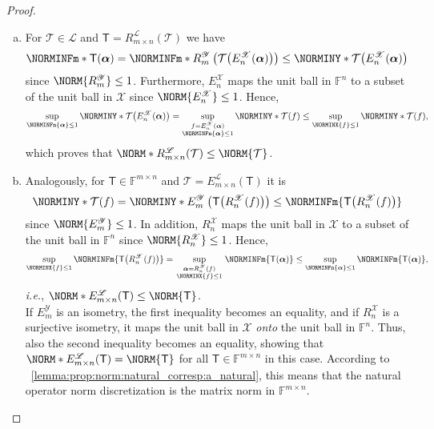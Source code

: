 \documentclass[a4paper]{paper}
\newcommand*{\SPC}[1]{{\ensuremath{\mathscr{#1}}}}
\newcommand*{\SPCL}{\SPC{L}}
\newcommand*{\SPCX}{\SPC{X}}
\newcommand*{\FIELD}{{\ensuremath{\mathbb{F}}}}
\newcommand*{\Fn}{{\ensuremath{\FIELD^n}}}
\newcommand*{\Fmxn}{{\ensuremath{\FIELD^{m \times n}}}}
\newcommand*{\OP}[1]{{\ensuremath{\mathcal{#1}}}}
\newcommand*{\OPT}{\OP{T}}
\newcommand{\DISCOP}[1]{{\ensuremath{\mathsf{#1}}}}
\newcommand*{\DISCOPT}{\DISCOP{T}}
\newcommand*{\EXT}[2]{\ensuremath{E_{#1}^{#2}}}
\newcommand*{\REST}[2]{\ensuremath{R_{#1}^{#2}}}
\newcommand*{\RnX}{{\ensuremath{\REST{n}{\SPC{X}}}}}
\newcommand*{\RmY}{{\ensuremath{\REST{m}{\SPC{Y}}}}}
\newcommand*{\EnX}{{\ensuremath{\EXT{n}{\SPC{X}}}}}
\newcommand*{\EmY}{{\ensuremath{\EXT{m}{\SPC{Y}}}}}
\newcommand*{\STACKSS}[2]{{\ensuremath{\genfrac{}{}{0pt}{1}{#1}{#2}}}}
\newcommand*{\ie}{\textsl{i.e.}\xspace}
\newcommand*{\BDalpha}{\boldsymbol{\alpha}}
\begin{document}
\begin{proof}~
 \begin{enumerate}[(a)]
  \item For $\OPT \in \SPCL$ and $\DISCOPT = \REST{m\times n}{\SPCL}(\OPT)$ we have
  \begin{equation*}
   \NORMINFm*{\DISCOPT(\BDalpha)} = \NORMINFm*{\RmY \left( \OPT\big( \EnX(\BDalpha) \big) \right)}
   \leq \NORMINY*{\OPT\big( \EnX(\BDalpha) \big)}
  \end{equation*}
  since $\NORM{\RmY} \leq 1$. Furthermore, $\EnX$ maps the unit ball in $\Fn$ to a subset of the unit ball in
  $\SPCX$ since $\NORM{\EnX} \leq 1$. Hence,
  \begin{equation*}
   \sup_{\NORMINFn{\BDalpha} \leq 1} \NORMINY*{\OPT\big( \EnX(\BDalpha) \big)}
   = \sup_{\substack{f=\EnX(\BDalpha)\\ \NORMINFn{\BDalpha} \leq 1}} \NORMINY*{\OPT(f)}
   \leq \sup_{\NORMINX{f} \leq 1} \NORMINY*{\OPT(f)},
  \end{equation*}
  which proves that $\NORM*{\REST{m\times n}{\SPCL}(\OPT)} \leq \NORM{\OPT}$.

  \item Analogously, for $\DISCOPT \in \Fmxn$ and $\OPT = \EXT{m\times n}{\SPCL}(\DISCOPT)$ it is
  \begin{equation*}
   \NORMINY*{\OPT(f)} = \NORMINY*{\EmY \left( \DISCOPT\big( \RnX(f) \big) \right)}
   \leq \NORMINFm{\DISCOPT\big( \RnX(f) \big)}
  \end{equation*}
  since $\NORM{\EmY} \leq 1$. In addition, $\RnX$ maps the unit ball in $\SPCX$ to a subset of the unit 
  ball in $\Fn$ since $\NORM{\RnX} \leq 1$. Hence,
  \begin{equation*}
   \sup_{\NORMINX{f} \leq 1} \NORMINFm{\DISCOPT\big( \RnX(f) \big)}
   = \sup_{\STACKSS{\BDalpha=\RnX(f)}{\NORMINX{f} \leq 1}} \NORMINFm{\DISCOPT(\BDalpha)}
   \leq \sup_{\NORMINFn{\BDalpha} \leq 1} \NORMINFm{\DISCOPT(\BDalpha)},
  \end{equation*}
  \ie, $\NORM*{E_{m\times n}^{\SPCL}(\DISCOPT)} \leq \NORM{\DISCOPT}$.\\[1em]
  If $\EmY$ is an isometry, the first inequality becomes an equality, and if $\RnX$ is a surjective isometry, it maps
  the unit ball in $\SPCX$ \emph{onto} the unit ball in $\Fn$. Thus, also the second inequality becomes an 
  equality, showing that $\NORM*{\EXT{m\times n}{\SPCL}(\DISCOPT)} = \NORM{\DISCOPT}$ for all 
  $\DISCOPT \in \Fmxn$ in this case. According to 
  ~\eqref{lemma:prop:norm:natural_corresp:a_natural}, this means that the natural 
  operator norm discretization is the matrix norm in $\Fmxn$.
 \end{enumerate}
\end{proof}
\end{document}
